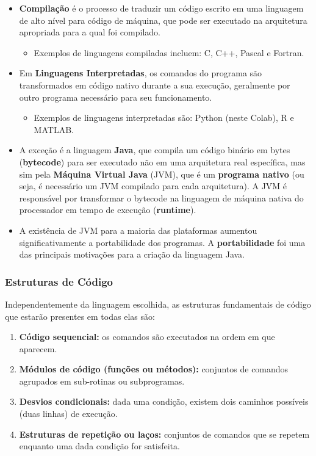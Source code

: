 \documentclass[12pt,a4paper]{article}
\providecommand{\tightlist}{%
      \setlength{\itemsep}{0pt}\setlength{\parskip}{0pt}}
\begin{document}
    \begin{itemize}
\item
  \textbf{Compilação} é o processo de traduzir um código escrito em uma
  linguagem de alto nível para código de máquina, que pode ser executado
  na arquitetura apropriada para a qual foi compilado.

  \begin{itemize}
  \tightlist
  \item
    Exemplos de linguagens compiladas incluem: C, C++, Pascal e Fortran.
  \end{itemize}
\item
  Em \textbf{Linguagens Interpretadas}, os comandos do programa são
  transformados em código nativo durante a sua execução, geralmente por
  outro programa necessário para seu funcionamento.

  \begin{itemize}
  \tightlist
  \item
    Exemplos de linguagens interpretadas são: Python (neste Colab), R e
    MATLAB.
  \end{itemize}
\item
  A exceção é a linguagem \textbf{Java}, que compila um código binário
  em bytes (\textbf{bytecode}) para ser executado não em uma arquitetura
  real específica, mas sim pela \textbf{Máquina Virtual Java} (JVM), que
  é um \textbf{programa nativo} (ou seja, é necessário um JVM compilado
  para cada arquitetura). A JVM é responsável por transformar o bytecode
  na linguagem de máquina nativa do processador em tempo de execução
  (\textbf{runtime}).
\item
  A existência de JVM para a maioria das plataformas aumentou
  significativamente a portabilidade dos programas. A
  \textbf{portabilidade} foi uma das principais motivações para a
  criação da linguagem Java.
\end{itemize}

    \hypertarget{estruturas-de-cuxf3digo}{%
\subsubsection{Estruturas de Código}\label{estruturas-de-cuxf3digo}}

    Independentemente da linguagem escolhida, as estruturas fundamentais de
código que estarão presentes em todas elas são:

\begin{enumerate}
\def\labelenumi{\arabic{enumi}.}
\tightlist
\item
  \textbf{Código sequencial:} os comandos são executados na ordem em que
  aparecem.
\item
  \textbf{Módulos de código (funções ou métodos):} conjuntos de comandos
  agrupados em sub-rotinas ou subprogramas.
\item
  \textbf{Desvios condicionais:} dada uma condição, existem dois
  caminhos possíveis (duas linhas) de execução.
\item
  \textbf{Estruturas de repetição ou laços:} conjuntos de comandos que
  se repetem enquanto uma dada condição for satisfeita.
\end{enumerate}
\end{document}
